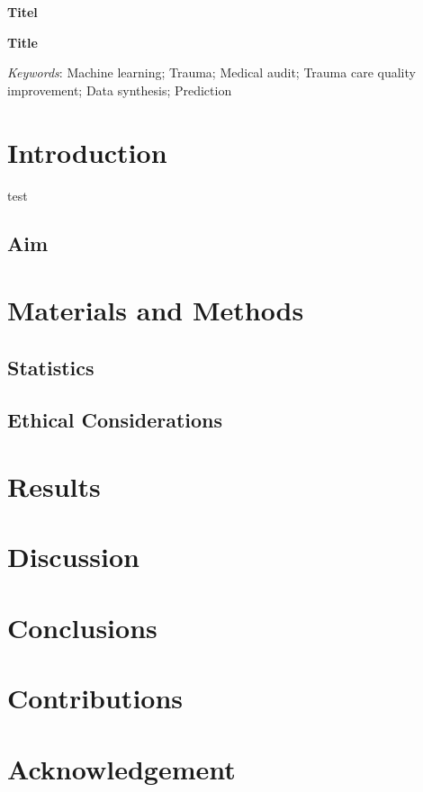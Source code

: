 \documentclass[12pt, letterpaper]{article}
\begin{document}
\begin{titlepage}
    
\end{titlepage}


\textbf{Titel}

\lipsum[1]

\vfill

\textbf{Title}

\lipsum[1]

\vfill

\textit{Keywords}: Machine learning; Trauma; Medical audit; Trauma care quality improvement; Data synthesis; Prediction

\newpage

\glsaddall
\printnoidxglossary[type=acronym,style=csuper]

\newpage
{}

\section{Introduction}
test \cite{ringdal_utstein_2008}

\subsection{Aim}

\section{Materials and Methods}

\subsection{Statistics}

\subsection{Ethical Considerations}

\section{Results}

\section{Discussion}

\section{Conclusions}

\section*{Contributions}

\section*{Acknowledgement}

\printbibliography
\end{document}
